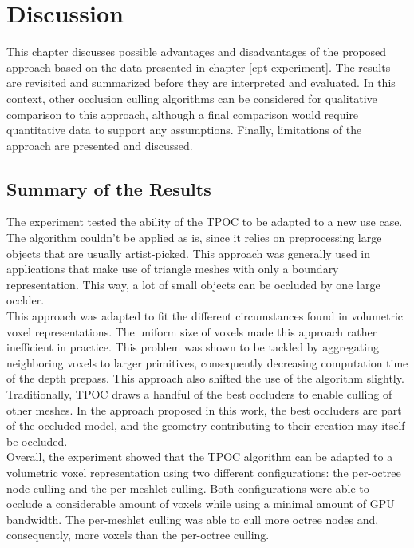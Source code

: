 \chapter{Discussion} \label{cpt-discussion}

This chapter discusses possible advantages and disadvantages of the proposed approach based on the data
presented in chapter \ref{cpt-experiment}. The results are revisited and summarized before they are 
interpreted and evaluated. In this context, other occlusion culling algorithms can be considered for 
qualitative comparison to this approach, although a final comparison would require quantitative data to 
support any assumptions. Finally, limitations of the approach are presented and discussed.

\section{Summary of the Results}

The experiment tested the ability of the \ac{TPOC} to be adapted to a new use case. The algorithm couldn't 
be applied as is, since it relies on preprocessing large objects that are usually artist-picked. This 
approach was generally used in applications that make use of triangle meshes with only a boundary representation. 
This way, a lot of small objects can be occluded by one large occlder. \\

\noindent
This approach was adapted to fit the different circumstances found in volumetric voxel representations. The 
uniform size of voxels made this approach rather inefficient in practice. This problem was shown to be 
tackled by aggregating neighboring voxels to larger primitives, consequently decreasing computation time 
of the depth prepass. This approach also shifted the use of the algorithm slightly. Traditionally, \ac{TPOC} 
draws a handful of the best occluders to enable culling of other meshes. In the approach proposed in this work, 
the best occluders are part of the occluded model, and the geometry contributing to their creation may 
itself be occluded. \\

\noindent
Overall, the experiment showed that the \ac{TPOC} algorithm can be adapted to a volumetric voxel representation 
using two different configurations: the per-octree node culling and the per-meshlet culling. Both configurations 
were able to occlude a considerable amount of voxels while using a minimal amount of \ac{GPU} bandwidth. The 
per-meshlet culling was able to cull more octree nodes and, consequently, more voxels than the per-octree culling. \\

